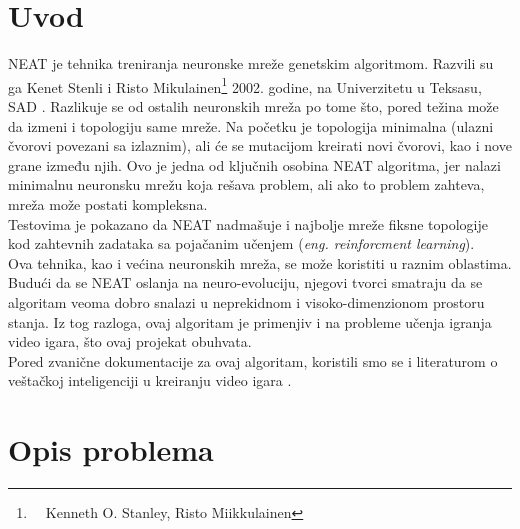 \documentclass[a4paper]{article}
\begin{document}


\tableofcontents

\newpage

\section{Uvod}
\label{sec:uvod}

NEAT je tehnika treniranja neuronske mreže genetskim algoritmom. Razvili su ga Kenet Stenli i Risto Mikulainen\footnote{~~Kenneth O. Stanley, Risto Miikkulainen} 2002. godine, na Univerzitetu u Teksasu, SAD \cite{NEAT}. Razlikuje se od ostalih neuronskih mreža po tome što, pored težina može da izmeni i topologiju same mreže. Na početku je topologija minimalna (ulazni čvorovi povezani sa izlaznim), ali će se mutacijom kreirati novi čvorovi, kao i nove grane između njih. Ovo je jedna od ključnih osobina NEAT algoritma, jer nalazi minimalnu neuronsku mrežu koja rešava problem, ali ako to problem zahteva, mreža može postati kompleksna.\\
Testovima je pokazano da NEAT nadmašuje i najbolje mreže fiksne topologije kod zahtevnih zadataka sa pojačanim učenjem (\emph{eng. reinforcment learning}).
\\

Ova tehnika, kao i većina neuronskih mreža, se može koristiti u raznim oblastima. Budući da se NEAT oslanja na neuro-evoluciju, njegovi tvorci smatraju da se algoritam veoma dobro snalazi u neprekidnom i visoko-dimenzionom prostoru stanja. Iz tog razloga, ovaj algoritam je primenjiv i na probleme učenja igranja video igara, što ovaj projekat obuhvata. \\
Pored zvanične dokumentacije za ovaj algoritam, koristili smo se i literaturom o veštačkoj inteligenciji u kreiranju video igara \cite{ai_techs}.


\section{Opis problema}
\label{opis_problema}
\end{document}
